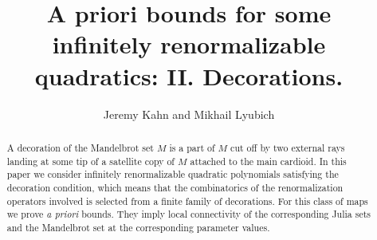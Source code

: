 \documentclass[12pt]{amsart}
\begin{document}
\bigskip\bigskip

\title[Decorations]{A priori bounds for some\\ infinitely renormalizable quadratics:
  {\small II. Decorations.} }
\author {Jeremy Kahn and Mikhail Lyubich}


\begin{abstract}
A decoration of the Mandelbrot set $M$ is a part of $M$ cut off by two external rays
landing at some tip of a satellite copy of $M$ attached to the main cardioid.
In this paper we consider infinitely renormalizable quadratic polynomials satisfying the decoration condition,
which means that the combinatorics of the renormalization operators involved is selected from
a finite family of decorations. For this class of maps we prove {\it a priori} bounds.
They imply local connectivity of the corresponding Julia sets and the Mandelbrot set
at the corresponding parameter values.
\end{abstract}

\setcounter{tocdepth}{1}

\maketitle

\thispagestyle{empty}


\tableofcontents









%
%


\end{document}
